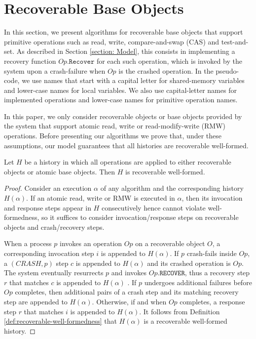 
\section{Recoverable Base Objects}
\label{section: Recoverable Base Objects}

In this section, we present algorithms for recoverable base objects that support primitive operations such as read, write, compare-and-swap (CAS) and test-and-set. As described in Section \ref{section: Model}, this consists in implementing a recovery function $Op.\texttt{Recover}$ for each such operation, which is invoked by the system upon a crash-failure when $Op$ is the crashed operation. In the pseudo-code, we use names that start with a capital letter for shared-memory variables and lower-case names for local variables. We also use capital-letter names for implemented operations and lower-case names for primitive operation names.

In this paper, we only consider recoverable objects or base objects provided by the system that support atomic read, write or read-modify-write (RMW) operations. Before presenting our algorithms we prove that, under these assumptions, our model guarantees that all histories are recoverable well-formed.

\begin{lemma}
\label{all-histories-well-formed}
Let $H$ be a history in which all operations are applied to either recoverable objects or atomic base objects. Then $H$ is recoverable well-formed.
\end{lemma}
\begin{proof}
Consider an execution $\alpha$ of any algorithm and the corresponding history $H(\alpha)$.
If an atomic read, write or RMW is executed in $\alpha$, then its invocation and response steps appear in $H$ consecutively hence cannot violate well-formedness, so it suffices to consider invocation/response steps on recoverable objects and crash/recovery steps.

When a process $p$ invokes an operation $Op$ on a recoverable object $O$, a corresponding invocation step $i$ is appended to $H(\alpha)$. If $p$ crash-fails inside $Op$, a $(CRASH, p)$ step $c$ is appended to $H(\alpha)$ and its crashed operation is $Op$. The system eventually resurrects $p$ and invokes $Op.\texttt{RECOVER}$, thus a recovery step $r$ that matches $c$ is appended to $H(\alpha)$ . If $p$ undergoes additional failures before $Op$ completes, then additional pairs of a crash step and its matching recovery step are appended to $H(\alpha)$. Otherwise, if and when $Op$ completes, a response step $r$ that matches $i$ is appended to $H(\alpha)$. It follows from Definition \ref{def:recoverable-well-formedness} that $H(\alpha)$ is a recoverable well-formed history.
\end{proof}



